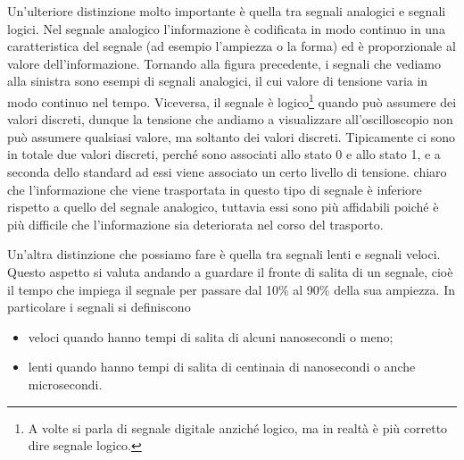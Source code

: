 \vspace{0.2cm}Un'ulteriore distinzione molto importante è quella tra segnali analogici e segnali logici. Nel segnale analogico l'informazione è codificata in modo continuo in una caratteristica del segnale (ad esempio l'ampiezza o la forma) ed è proporzionale al valore dell'informazione. Tornando alla figura precedente, i segnali che vediamo alla sinistra sono esempi di segnali analogici, il cui valore di tensione varia in modo continuo nel tempo. Viceversa, il segnale è logico\footnote{A volte si parla di segnale digitale anziché logico, ma in realtà è più corretto dire segnale logico.} quando può assumere dei valori discreti, dunque la tensione che andiamo a visualizzare all'oscilloscopio non può assumere qualsiasi valore, ma soltanto dei valori discreti. Tipicamente ci sono in totale due valori discreti, perché sono associati allo stato 0 e allo stato 1, e a seconda dello standard ad essi viene associato un certo livello di tensione. \E chiaro che l'informazione che viene trasportata in questo tipo di segnale è inferiore rispetto a quello del segnale analogico, tuttavia essi sono più affidabili poiché è più difficile che l'informazione sia deteriorata nel corso del
trasporto.

Un'altra distinzione che possiamo fare è quella tra segnali lenti e segnali veloci. Questo aspetto si valuta andando a guardare il fronte di salita di un segnale, cioè il tempo che impiega il segnale per passare dal 10\% al 90\% della sua ampiezza. In particolare i segnali si definiscono
\begin{itemize}
   \item veloci quando hanno tempi di salita di alcuni nanosecondi o meno;
   \item lenti quando hanno tempi di salita di centinaia di nanosecondi o anche microsecondi.
\end{itemize}


